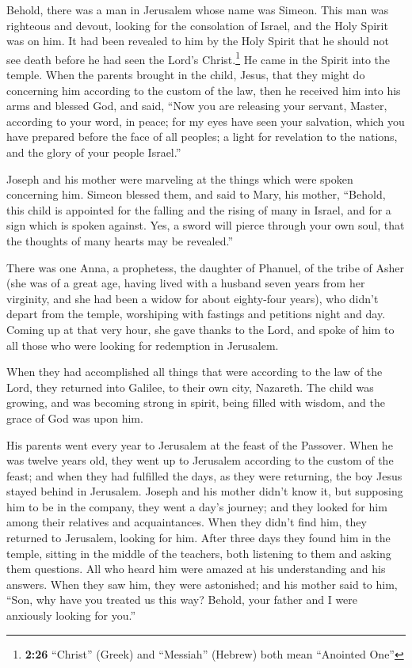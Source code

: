  Behold, there was a man in Jerusalem whose name was
Simeon. This man was righteous and devout, looking for the consolation
of Israel, and the Holy Spirit was on him.  It had been
revealed to him by the Holy Spirit that he should not see death before
he had seen the Lord's Christ.\footnote{\textbf{2:26} ``Christ'' (Greek)
  and ``Messiah'' (Hebrew) both mean ``Anointed One''} 
He came in the Spirit into the temple. When the parents brought in the
child, Jesus, that they might do concerning him according to the custom
of the law,  then he received him into his arms and
blessed God, and said,  ``Now you are releasing your
servant, Master, according to your word, in peace;  for
my eyes have seen your salvation,  which you have
prepared before the face of all peoples;  a light for
revelation to the nations, and the glory of your people Israel.''

 Joseph and his mother were marveling at the things which
were spoken concerning him.  Simeon blessed them, and
said to Mary, his mother, ``Behold, this child is appointed for the
falling and the rising of many in Israel, and for a sign which is spoken
against.  Yes, a sword will pierce through your own soul,
that the thoughts of many hearts may be revealed.''

 There was one Anna, a prophetess, the daughter of
Phanuel, of the tribe of Asher (she was of a great age, having lived
with a husband seven years from her virginity,  and she
had been a widow for about eighty-four years), who didn't depart from
the temple, worshiping with fastings and petitions night and day.
 Coming up at that very hour, she gave thanks to the
Lord, and spoke of him to all those who were looking for redemption in
Jerusalem.

 When they had accomplished all things that were
according to the law of the Lord, they returned into Galilee, to their
own city, Nazareth.  The child was growing, and was
becoming strong in spirit, being filled with wisdom, and the grace of
God was upon him.

 His parents went every year to Jerusalem at the feast of
the Passover.  When he was twelve years old, they went up
to Jerusalem according to the custom of the feast;  and
when they had fulfilled the days, as they were returning, the boy Jesus
stayed behind in Jerusalem. Joseph and his mother didn't know it,
 but supposing him to be in the company, they went a
day's journey; and they looked for him among their relatives and
acquaintances.  When they didn't find him, they returned
to Jerusalem, looking for him.  After three days they
found him in the temple, sitting in the middle of the teachers, both
listening to them and asking them questions.  All who
heard him were amazed at his understanding and his answers.
 When they saw him, they were astonished; and his mother
said to him, ``Son, why have you treated us this way? Behold, your
father and I were anxiously looking for you.''

